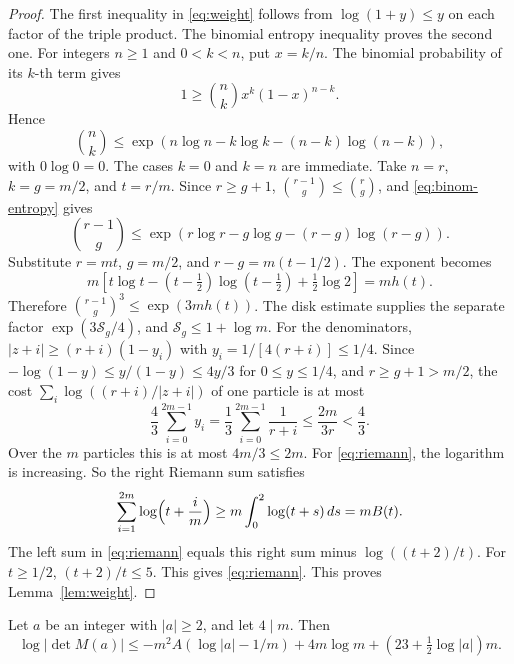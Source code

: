 \begin{proof}
The first inequality in \eqref{eq:weight} follows from \(\log(1+y)\le y\) on each factor of the triple product. The binomial entropy inequality proves the second one.
For integers \(n\ge1\) and \(0<k<n\), put \(x=k/n\). The binomial probability of its \(k\)-th term gives
\[
 1\ge\binom nkx^k(1-x)^{n-k}.
\]
Hence
\begin{equation}\label{eq:binom-entropy}
 \binom nk\le
 \exp\!\left(n\log n-k\log k-(n-k)\log(n-k)\right),
\end{equation}
with \(0\log0=0\). The cases \(k=0\) and \(k=n\) are immediate. Take \(n=r\), \(k=g=m/2\), and \(t=r/m\). Since \(r\ge g+1\), \(\binom{r-1}{g}\le\binom rg\), and \eqref{eq:binom-entropy} gives
\[
 \binom{r-1}{g}\le\exp\!\left(r\log r-g\log g-(r-g)\log(r-g)\right).
\]
Substitute \(r=mt\), \(g=m/2\), and \(r-g=m(t-1/2)\). The exponent becomes
\[
 m\left[t\log t-(t-\tfrac12)\log(t-\tfrac12)+\tfrac12\log2\right]=m h(t).
\]
Therefore \(\binom{r-1}{g}^{3}\le\exp(3m h(t))\). The disk estimate supplies the separate factor \(\exp(3\mathcal S_g/4)\), and \(\mathcal S_g\le1+\log m\).
For the denominators, \(|z+i|\ge(r+i)(1-y_i)\) with \(y_i=1/[4(r+i)]\le1/4\). Since \(-\log(1-y)\le y/(1-y)\le4y/3\) for \(0\le y\le1/4\), and \(r\ge g+1>m/2\), the cost \(\sum_i\log((r+i)/|z+i|)\) of one particle is at most
\[
 \frac43\sum_{i=0}^{2m-1}y_i=\frac13\sum_{i=0}^{2m-1}\frac1{r+i}
 \le\frac{2m}{3r}<\frac43 .
\]
Over the \(m\) particles this is at most \(4m/3\le2m\). For \eqref{eq:riemann}, the logarithm is increasing. So the right Riemann sum satisfies
\[
 \sum_{i=1}^{2m}\log\Bigl(t+\frac im\Bigr)\ge m\int_0^2\log(t+s)\,ds=mB(t).
\]
The left sum in \eqref{eq:riemann} equals this right sum minus \(\log((t+2)/t)\). For \(t\ge1/2\), \((t+2)/t\le5\). This gives \eqref{eq:riemann}. This proves Lemma~\ref{lem:weight}.
\end{proof}

\begin{proposition}\label{prop:analytic}
Let \(a\) be an integer with \(|a|\ge2\), and let \(4\mid m\). Then
\begin{equation}\label{eq:determinant-bound}
 \log|\det M(a)|
 \le -m^2 A(\log|a|-1/m)
       +4m\log m+(23+\tfrac12\log|a|)m.
\end{equation}
\end{proposition}

